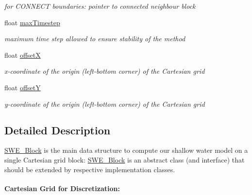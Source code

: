 \begin{DoxyCompactItemize}
\begin{DoxyCompactList}\small\item\em for C\-O\-N\-N\-E\-C\-T boundaries\-: pointer to connected neighbour block \end{DoxyCompactList}\item 
float \hyperlink{classSWE__Block_a05cbc9b40e0483bf73dbc2bdeae7dee3}{max\-Timestep}
\begin{DoxyCompactList}\small\item\em maximum time step allowed to ensure stability of the method \end{DoxyCompactList}\item 
\hypertarget{classSWE__Block_aa9e9b1fa797c133c4989e4c54f09b542}{float \hyperlink{classSWE__Block_aa9e9b1fa797c133c4989e4c54f09b542}{offset\-X}}\label{classSWE__Block_aa9e9b1fa797c133c4989e4c54f09b542}

\begin{DoxyCompactList}\small\item\em x-\/coordinate of the origin (left-\/bottom corner) of the Cartesian grid \end{DoxyCompactList}\item 
\hypertarget{classSWE__Block_aa05241101a66f0f0548eba6dbbaa1bbb}{float \hyperlink{classSWE__Block_aa05241101a66f0f0548eba6dbbaa1bbb}{offset\-Y}}\label{classSWE__Block_aa05241101a66f0f0548eba6dbbaa1bbb}

\begin{DoxyCompactList}\small\item\em y-\/coordinate of the origin (left-\/bottom corner) of the Cartesian grid \end{DoxyCompactList}\end{DoxyCompactItemize}


\subsection{Detailed Description}
\hyperlink{classSWE__Block}{S\-W\-E\-\_\-\-Block} is the main data structure to compute our shallow water model on a single Cartesian grid block\-: \hyperlink{classSWE__Block}{S\-W\-E\-\_\-\-Block} is an abstract class (and interface) that should be extended by respective implementation classes.

\paragraph*{Cartesian Grid for Discretization\-:}

